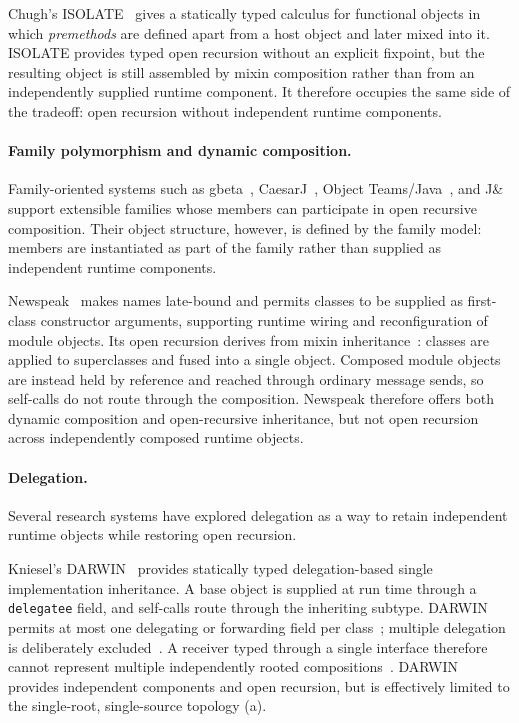 \documentclass[acmsmall,nonacm]{acmart}
\theoremstyle{acmplain}
\newcommand{\code}[1]{\texttt{#1}}
\begin{document}
Chugh's ISOLATE~\cite{chugh2015} gives a statically typed calculus for
functional objects in which \emph{premethods} are defined apart from a host
object and later mixed into it. ISOLATE provides typed open recursion without
an explicit fixpoint, but the resulting object is still assembled by mixin
composition rather than from an independently supplied runtime component.
It therefore occupies the same side of the tradeoff: open recursion without
independent runtime components.

\paragraph{Family polymorphism and dynamic composition.}
Family-oriented systems such as gbeta~\cite{ernst2001,ernst2006}, CaesarJ~\cite{aracic2006},
Object Teams/Java~\cite{herrmann2002}, and J\&~\cite{nystrom2006}
support extensible families whose members can participate in open recursive
composition. Their object structure, however, is defined by the family model:
members are instantiated as part of the family rather than supplied as
independent runtime components.

Newspeak~\cite{bracha2010} makes names late-bound and permits classes to be
supplied as first-class constructor arguments, supporting runtime wiring and
reconfiguration of module objects. Its open recursion derives from mixin
inheritance~\cite{bracha1990}: classes are applied to superclasses and fused
into a single object. Composed module objects are instead held by reference
and reached through ordinary message sends, so self-calls do not route through
the composition. Newspeak therefore offers both dynamic composition and
open-recursive inheritance, but not open recursion across independently
composed runtime objects.

\paragraph{Delegation.}
Several research systems have explored delegation as a way to retain independent
runtime objects while restoring open recursion.

Kniesel's DARWIN~\cite{kniesel1999,kniesel2000} provides statically typed
delegation-based single implementation inheritance. A base object is supplied
at run time through a \code{delegatee} field, and self-calls route through the
inheriting subtype. DARWIN permits at most one delegating or forwarding field
per class~\cite[\S6.5]{kniesel2000}; multiple delegation is deliberately
excluded~\cite[\S6.5.1]{kniesel2000}. A receiver typed through a single
interface therefore cannot represent multiple independently rooted
compositions~\cite[\S5.5.4]{kniesel2000}. DARWIN provides independent
components and open recursion, but is effectively limited to the
single-root, single-source topology (a).
\end{document}
